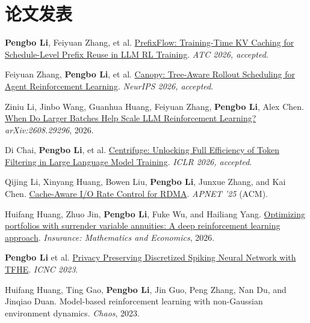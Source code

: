 \documentclass{resume}
\begin{document}
\section{论文发表}
\begin{enumerate}[label={[\arabic*]}, parsep=0.2ex, leftmargin=*]
  \item \textbf{Pengbo Li}, Feiyuan Zhang, et al. \href{https://arxiv.org/html/2606.01143v4}{PrefixFlow: Training-Time KV Caching for Schedule-Level Prefix Reuse in LLM RL Training}. \textit{ATC 2026, accepted}.
  \item Feiyuan Zhang, \textbf{Pengbo Li}, et al. \href{https://openreview.net/forum?id=FPJ4b4JwEE}{Canopy: Tree-Aware Rollout Scheduling for Agent Reinforcement Learning}. \textit{NeurIPS 2026, accepted}.
  \item Ziniu Li, Jinbo Wang, Guanhua Huang, Feiyuan Zhang, \textbf{Pengbo Li}, Alex Chen. \href{https://arxiv.org/abs/2608.29296}{When Do Larger Batches Help Scale LLM Reinforcement Learning?} \textit{arXiv:2608.29296}, 2026.
  \item Di Chai, \textbf{Pengbo Li}, et al. \href{https://openreview.net/forum?id=eshXwEnENV}{Centrifuge: Unlocking Full Efficiency of Token Filtering in Large Language Model Training}. \textit{ICLR 2026, accepted}.
  \item Qijing Li, Xinyang Huang, Bowen Liu, \textbf{Pengbo Li}, Junxue Zhang, and Kai Chen. \href{https://dl.acm.org/doi/10.1145/3735358.3735376}{Cache-Aware I/O Rate Control for RDMA}. \textit{APNET '25} (ACM).
  \item Huifang Huang, Zhuo Jin, \textbf{Pengbo Li}, Fuke Wu, and Hailiang Yang. \href{https://www.sciencedirect.com/science/article/pii/S0167668725001246}{Optimizing portfolios with surrender variable annuities: A deep reinforcement learning approach}. \textit{Insurance: Mathematics and Economics}, 2026.
  \item \textbf{Pengbo Li} et al. \href{https://doi.org/10.1109/ICNC59488.2023.10462898}{Privacy Preserving Discretized Spiking Neural Network with TFHE}. \textit{ICNC 2023}.
  \item Huifang Huang, Ting Gao, \textbf{Pengbo Li}, Jin Guo, Peng Zhang, Nan Du, and Jinqiao Duan. Model-based reinforcement learning with non-Gaussian environment dynamics. \textit{Chaos}, 2023.
\end{enumerate}
\end{document}
